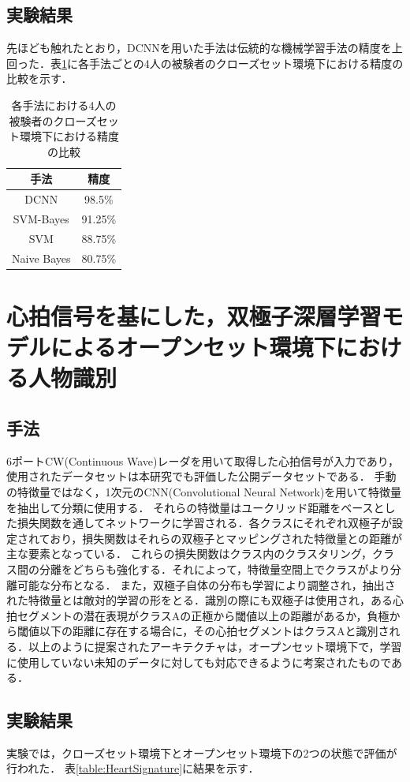 \subsection{実験結果}
先ほども触れたとおり，DCNNを用いた手法は伝統的な機械学習手法の精度を上回った．表\ref{table:HeartID}に各手法ごとの4人の被験者のクローズセット環境下における精度の比較を示す．

\begin{table}[H]
\caption{各手法における4人の被験者のクローズセット環境下における精度の比較}
\centering
\begin{tabular}{cc}
\hline
手法 & 精度 \\
\hline
DCNN & 98.5\% \\
SVM-Bayes & 91.25\% \\
SVM & 88.75\% \\
Naive Bayes & 80.75\% \\
\hline
\end{tabular}
\label{table:HeartID}
\end{table}

\section{心拍信号を基にした，双極子深層学習モデルによるオープンセット環境下における人物識別\cite{paper:HeartSignature}}
\subsection{手法}
6ポートCW(Continuous Wave)レーダを用いて取得した心拍信号が入力であり，使用されたデータセットは本研究でも評価した公開データセットである．
手動の特徴量ではなく，1次元のCNN(Convolutional Neural Network)を用いて特徴量を抽出して分類に使用する．
それらの特徴量はユークリッド距離をベースとした損失関数を通してネットワークに学習される．各クラスにそれぞれ双極子が設定されており，損失関数はそれらの双極子とマッピングされた特徴量との距離が主な要素となっている．
これらの損失関数はクラス内のクラスタリング，クラス間の分離をどちらも強化する．それによって，特徴量空間上でクラスがより分離可能な分布となる．
また，双極子自体の分布も学習により調整され，抽出された特徴量とは敵対的学習の形をとる．識別の際にも双極子は使用され，ある心拍セグメントの潜在表現がクラスAの正極から閾値以上の距離があるか，負極から閾値以下の距離に存在する場合に，その心拍セグメントはクラスAと識別される．以上のように提案されたアーキテクチャは，オープンセット環境下で，学習に使用していない未知のデータに対しても対応できるように考案されたものである．

\subsection{実験結果}
実験では，クローズセット環境下とオープンセット環境下の2つの状態で評価が行われた．
表\ref{table:HeartSignature}に結果を示す．

